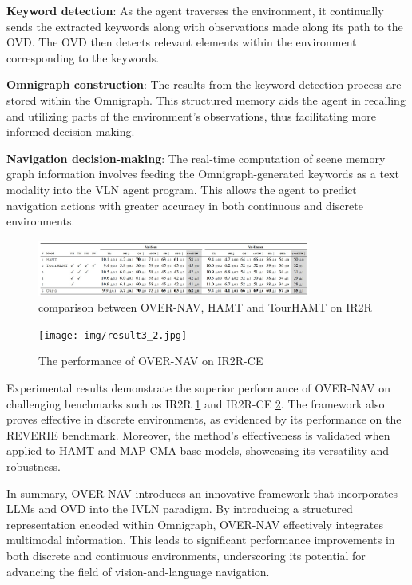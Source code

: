 \textbf{Keyword detection}: As the agent traverses the environment, it continually sends the extracted keywords along with observations made along its path to the OVD. The OVD then detects relevant elements within the environment corresponding to the keywords.

\textbf{Omnigraph construction}: The results from the keyword detection process are stored within the Omnigraph. This structured memory aids the agent in recalling and utilizing parts of the environment’s observations, thus facilitating more informed decision-making.


\textbf{Navigation decision-making}: The real-time computation of scene memory graph information involves feeding the Omnigraph-generated keywords as a text modality into the VLN agent program. This allows the agent to predict navigation actions with greater accuracy in both continuous and discrete environments.


\begin{figure}[h]
    \centering
    \includegraphics[width=0.8\textwidth]{img/result3_1.jpg} %
    \caption{comparison between OVER-NAV, HAMT and TourHAMT on IR2R}
    \label{fig:IR2R}
\end{figure}
\begin{figure}[h]
    \centering
    \texttt{[image: img/result3\_2.jpg]} %
    \caption{The performance of OVER-NAV on IR2R-CE}
    \label{fig:IR2R-CE}
\end{figure}

Experimental results demonstrate the superior performance of OVER-NAV on challenging benchmarks such as IR2R \ref{fig:IR2R} and IR2R-CE \ref{fig:IR2R-CE}. The framework also proves effective in discrete environments, as evidenced by its performance on the REVERIE benchmark. Moreover, the method’s effectiveness is validated when applied to HAMT and MAP-CMA base models, showcasing its versatility and robustness.

In summary, OVER-NAV introduces an innovative framework that incorporates LLMs and OVD into the IVLN paradigm. By introducing a structured representation encoded within Omnigraph, OVER-NAV effectively integrates multimodal information. This leads to significant performance improvements in both discrete and continuous environments, underscoring its potential for advancing the field of vision-and-language navigation.